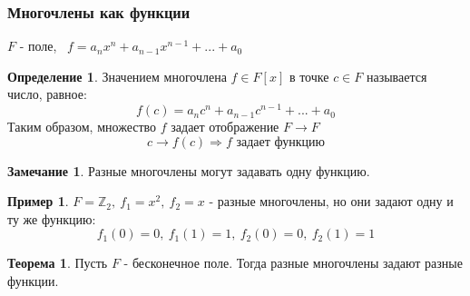 \documentclass[a4paper, 12pt]{article}
\newcommand{\Z}{\mathbb Z}
\theoremstyle{definition}
\newtheorem*{definition}{Определение}
\newtheorem*{theorem}{Теорема}
\newtheorem*{remark}{Замечание}
\newtheorem*{example1}{Пример}
\begin{document}
  \subsubsection{Многочлены как функции}
  $F$ - поле, \ $f = a_nx^n + a_{n-1}x^{n-1} +...+ a_0$
  \begin{definition}
    Значением многочлена $f \in F[x]$ в точке $c \in F$ называется число, равное: $$f(c) = a_nc^n + a_{n-1}c^{n-1} +...+ a_0$$
     Таким образом, множество $f$ задает отображение $F \to F$
     $$c \to f(c) \Longrightarrow f \text{ задает функцию}$$      
  \end{definition} 
  \begin{remark}
    Разные многочлены могут задавать одну функцию.
  \end{remark} 
  \begin{example1}
    $F = \Z_2, \ f_1 = x^2, \ f_2 = x$ - разные многочлены, но они задают одну и ту же функцию:
    $$f_1(0)=0, \ f_1(1) = 1, \ f_2(0)=0, \ f_2(1) = 1$$ 
  \end{example1}
  \begin{theorem}
    Пусть $F$ - бесконечное поле. Тогда разные многочлены задают разные функции. 
  \end{theorem} 
\end{document}
